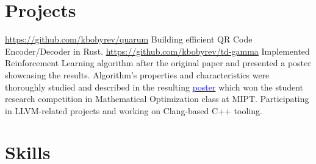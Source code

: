 \documentclass[10pt,a4paper,sans]{moderncv}
\begin{document}
\section{Projects}
    {\url{https://github.com/kbobyrev/quarum}}{}
    {Building efficient QR Code Encoder/Decoder in Rust.}
    {\url{https://github.com/kbobyrev/td-gamma}}{}
    {Implemented Reinforcement Learning algorithm after the original paper and
     presented a poster showcasing the results. Algorithm's properties and
     characteristics were thoroughly studied and described in the resulting
     \href{https://kbobyrev.github.io/resources/TD-Gamma-Poster.pdf}{\textcolor{blue}{poster}}
     which won the student research competition in Mathematical Optimization
     class at MIPT.}
    {Participating in LLVM-related projects and working on Clang-based C++
     tooling.}

\section{Skills}

\nocite{*}


\end{document}
